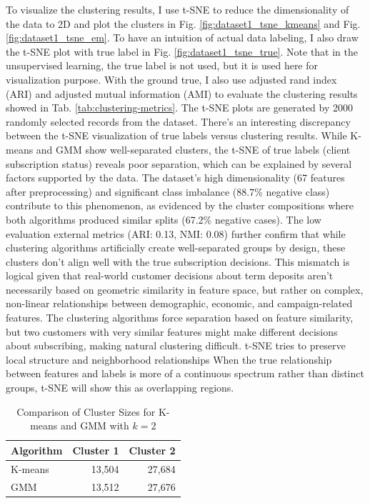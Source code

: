\documentclass[conference]{IEEEtran}
\begin{document}
To visualize the clustering results, I use t-SNE to reduce the dimensionality of the data to 2D and plot the clusters in Fig. \ref{fig:dataset1_tsne_kmeans} and Fig. \ref{fig:dataset1_tsne_em}.
To have an intuition of actual data labeling, I also draw the t-SNE plot with true label in Fig. \ref{fig:dataset1_tsne_true}. Note that in the unsupervised learning, the true label is not used, but it is used here for visualization purpose. With the ground true, I also use adjusted rand index (ARI) and adjusted mutual information (AMI) to evaluate the clustering results showed in Tab. \ref{tab:clustering-metrics}.
The t-SNE plots are generated by 2000 randomly selected records from the dataset. There's an interesting discrepancy between the t-SNE visualization of true labels versus clustering results. While K-means and GMM show well-separated clusters, the t-SNE of true labels (client subscription status) reveals poor separation, which can be explained by several factors supported by the data. The dataset's high dimensionality (67 features after preprocessing) and significant class imbalance (88.7\% negative class) contribute to this phenomenon, as evidenced by the cluster compositions where both algorithms produced similar splits (67.2\% negative cases). The low evaluation external metrics (ARI: 0.13, NMI: 0.08) further confirm that while clustering algorithms artificially create well-separated groups by design, these clusters don't align well with the true subscription decisions. This mismatch is logical given that real-world customer decisions about term deposits aren't necessarily based on geometric similarity in feature space, but rather on complex, non-linear relationships between demographic, economic, and campaign-related features. The clustering algorithms force separation based on feature similarity, but two customers with very similar features might make different decisions about subscribing, making natural clustering difficult. t-SNE tries to preserve local structure and neighborhood relationships
When the true relationship between features and labels is more of a continuous spectrum rather than distinct groups, t-SNE will show this as overlapping regions.
\begin{table}[!t]
    \renewcommand{\arraystretch}{1.3}
    \caption{Comparison of Cluster Sizes for K-means and GMM with $k=2$}
    \label{table:cluster_sizes}
    \centering
    \begin{tabular}{l|r|r}
        \hline
        \textbf{Algorithm} & \textbf{Cluster 1} & \textbf{Cluster 2} \\
        \hline
        K-means & 13,504 & 27,684 \\
        GMM & 13,512 & 27,676 \\
        \hline
    \end{tabular}
    \label{table:dataset1_task1_cluster_sizes} 
\end{table}
\end{document}
